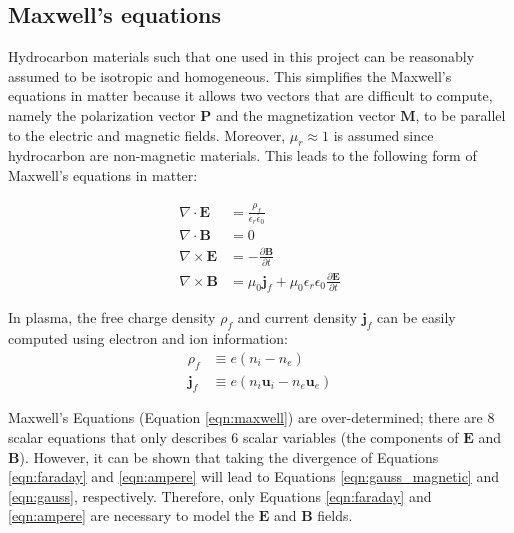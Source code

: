 \subsection{Maxwell's equations}
\label{sub:maxwell}
Hydrocarbon materials such that one used in this project can be reasonably assumed to be isotropic and homogeneous. This simplifies the Maxwell's equations in matter because it allows two vectors that are difficult
to compute, namely the polarization vector $\mathbf{P}$ and the magnetization vector $\mathbf{M}$, to be parallel to the electric and magnetic fields. Moreover, $\mu_r \approx 1$ is assumed since hydrocarbon are
non-magnetic materials. This leads to the following form of Maxwell's equations in matter:

\begin{subequations}
    \begin{align}
        \nabla \cdot \mathbf{E} &= \frac{\rho_f}{\epsilon_r \epsilon_0} \label{eqn:gauss} \\
        \nabla \cdot \mathbf{B} &= 0 \label{eqn:gauss_magnetic} \\
        \nabla \times \mathbf{E} &= -\frac{\partial \mathbf{B}}{\partial t} \label{eqn:faraday} \\
        \nabla \times \mathbf{B} &= \mu_0 \mathbf{j}_f + \mu_0 \epsilon_r \epsilon_0 \frac{\partial \mathbf{E}}{\partial t} \label{eqn:ampere}
    \end{align}
    \label{eqn:maxwell}
\end{subequations}

In plasma, the free charge density $\rho_f$ and current density $\mathbf{j}_f$ can be easily computed using electron and ion information:
\begin{subequations}
    \begin{align}
        \rho_f &\equiv e(n_i - n_e) \label{eqn:charge_density} \\
        \mathbf{j}_f &\equiv e(n_i \mathbf{u}_i - n_e \mathbf{u}_e) \label{eqn:current_density}
    \end{align}
\end{subequations}


Maxwell's Equations (Equation \ref{eqn:maxwell}) are over-determined; there are 8 scalar equations that only describes 6 scalar variables (the components of $\mathbf{E}$ and $\mathbf{B}$). However, it can be shown
that taking the divergence of Equations \ref{eqn:faraday} and \ref{eqn:ampere} will lead to Equations \ref{eqn:gauss_magnetic} and \ref{eqn:gauss}, respectively. Therefore, only Equations \ref{eqn:faraday} and
\ref{eqn:ampere} are necessary to model the $\mathbf{E}$ and $\mathbf{B}$ fields.

